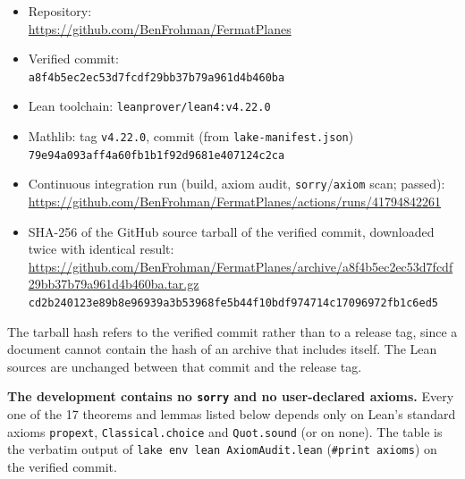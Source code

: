 \documentclass[11pt]{amsart}
\theoremstyle{definition}
\theoremstyle{remark}
\begin{document}
{\raggedright
\begin{itemize}
\item Repository:\\ {\footnotesize\url{https://github.com/BenFrohman/FermatPlanes}}
\item Verified commit:\\ {\footnotesize\texttt{a8f4b5ec2ec53d7fcdf29bb37b79a961d4b460ba}}
\item Lean toolchain: \texttt{leanprover/lean4:v4.22.0}
\item Mathlib: tag \texttt{v4.22.0}, commit (from \texttt{lake-manifest.json})\\ {\footnotesize\texttt{79e94a093aff4a60fb1b1f92d9681e407124c2ca}}
\item Continuous integration run (build, axiom audit, \texttt{sorry}/\texttt{axiom} scan; passed):\\ {\footnotesize\url{https://github.com/BenFrohman/FermatPlanes/actions/runs/41794842261}}
\item SHA-256 of the GitHub source tarball of the verified commit, downloaded twice with identical result:\\ {\footnotesize\url{https://github.com/BenFrohman/FermatPlanes/archive/a8f4b5ec2ec53d7fcdf29bb37b79a961d4b460ba.tar.gz}}\\
{\footnotesize\texttt{cd2b240123e89b8e96939a3b53968fe5b44f10bdf974714c17096972fb1c6ed5}}
\end{itemize}\par}

The tarball hash refers to the verified commit rather than to a release tag, since a document cannot contain the hash of an archive that includes itself. The Lean sources are unchanged between that commit and the release tag.

\textbf{The development contains no \texttt{sorry} and no user-declared axioms.} Every one of the 17 theorems and lemmas listed below depends only on Lean's standard axioms \texttt{propext}, \texttt{Classical.choice} and \texttt{Quot.sound} (or on none). The table is the verbatim output of \texttt{lake env lean AxiomAudit.lean} (\texttt{\#print axioms}) on the verified commit.
\end{document}
